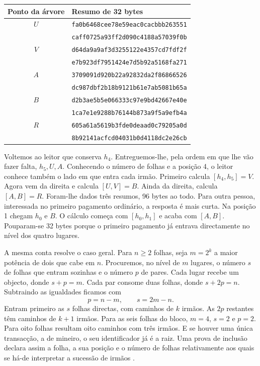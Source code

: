 \begin{center}\small
\begin{tabular}{c l}
Ponto da árvore & Resumo de 32 bytes\\ \hline
\(U\) & \texttt{fa0b6468cee78e59eac0cacbbb263551}\\
 & \texttt{caff0725a93ff2d090c4188a57039f0b}\\
\(V\) & \texttt{d64da9a9af3d3255122e4357cd7fdf2f}\\
 & \texttt{e7b923df7951424e7d5b92a5168fa271}\\
\(A\) & \texttt{3709091d920b22a92832da2f86866526}\\
 & \texttt{dc987dbf2b18b9121b61e7ab5081b65a}\\
\(B\) & \texttt{d2b3ae5b5e066333c97e9bd42667e40e}\\
 & \texttt{1ca7e1e9288b76144b873a9f5a9efb4a}\\
\(R\) & \texttt{605a61a5619b3fde0deaad0c79205a0d}\\
 & \texttt{8b92141acfcd04031b0d4118dc2e26cb}
\end{tabular}
\end{center}

Voltemos ao leitor que conserva \(h_4\). Entreguemos-lhe, pela
ordem em que lhe vão fazer falta, \(h_5,U,A\). Conhecendo o número
de folhas e a posição 4, o leitor conhece também o lado em que entra
cada irmão. Primeiro calcula \([h_4,h_5]=V\). Agora vem da direita e
calcula \([U,V]=B\). Ainda da direita, calcula \([A,B]=R\). Foram-lhe
dados três resumos, 96 bytes ao todo. Para outra pessoa, interessada
no primeiro pagamento ordinário, a resposta é mais curta. Na posição 1
chegam \(h_0\) e \(B\). O cálculo começa com \([h_0,h_1]\) e acaba com
\([A,B]\). Pouparam-se 32 bytes porque o primeiro pagamento já entrava
directamente no nível dos quatro lugares.

A mesma conta resolve o caso geral. Para \(n\geq 2\) folhas, seja
\(m=2^k\) a maior potência de dois que cabe em \(n\). Procuremos, no
nível de \(m\) lugares, o número \(s\) de folhas que entram sozinhas
e o número \(p\) de pares. Cada lugar recebe um objecto, donde
\(s+p=m\). Cada par consome duas folhas, donde \(s+2p=n\). Subtraindo
as igualdades ficamos com
\[
                    p=n-m,\qquad s=2m-n .
\]
Entram primeiro as \(s\) folhas directas, com caminhos de \(k\)
irmãos. As \(2p\) restantes têm caminhos de \(k+1\) irmãos. Para as
seis folhas do bloco, \(m=4\), \(s=2\) e \(p=2\). Para oito folhas
resultam oito caminhos com três irmãos. E se houver uma única
transacção, a de mineiro, o seu identificador já é a raiz. Uma prova
de inclusão declara assim a folha, a sua posição e o número de
folhas relativamente aos quais se há-de interpretar a sucessão de
irmãos \cite{monero-source-v16}.

